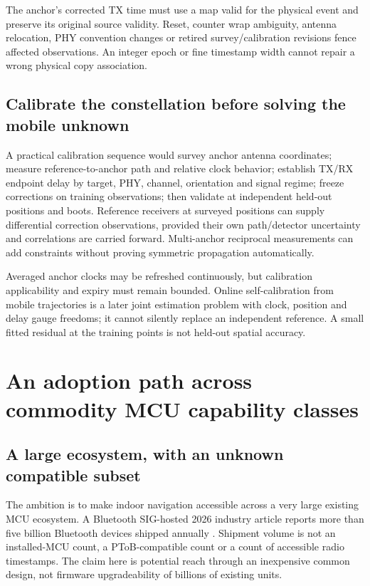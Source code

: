\documentclass[11pt,letterpaper]{article}
\begin{document}
The anchor's corrected TX time must use a map valid for the physical event and preserve its original source validity. Reset, counter wrap ambiguity, antenna relocation, PHY convention changes or retired survey/calibration revisions fence affected observations. An integer epoch or fine timestamp width cannot repair a wrong physical copy association.

\subsection{Calibrate the constellation before solving the mobile unknown}
A practical calibration sequence would survey anchor antenna coordinates; measure reference-to-anchor path and relative clock behavior; establish TX/RX endpoint delay by target, PHY, channel, orientation and signal regime; freeze corrections on training observations; then validate at independent held-out positions and boots. Reference receivers at surveyed positions can supply differential correction observations, provided their own path/detector uncertainty and correlations are carried forward. Multi-anchor reciprocal measurements can add constraints without proving symmetric propagation automatically.

Averaged anchor clocks may be refreshed continuously, but calibration applicability and expiry must remain bounded. Online self-calibration from mobile trajectories is a later joint estimation problem with clock, position and delay gauge freedoms; it cannot silently replace an independent reference. A small fitted residual at the training points is not held-out spatial accuracy.

\section{An adoption path across commodity MCU capability classes}\label{sec:adoption}
\subsection{A large ecosystem, with an unknown compatible subset}
The ambition is to make indoor navigation accessible across a very large existing MCU ecosystem. A Bluetooth SIG-hosted 2026 industry article reports more than five billion Bluetooth devices shipped annually \cite{market}. Shipment volume is not an installed-MCU count, a PToB-compatible count or a count of accessible radio timestamps. The claim here is potential reach through an inexpensive common design, not firmware upgradeability of billions of existing units.
\end{document}
